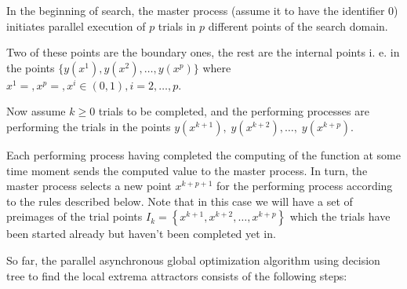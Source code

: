 \documentclass{svproc}
\begin{document}
In the beginning of search, the master process (assume it to have the identifier $0$) initiates parallel  execution of $p$ trials in $p$ different points of the search domain.

Two of these points are the boundary ones, the rest are the internal points i. e. in the points  $\{y\left(x^1\right),y\left(x^2\right),\ldots,y\left(x^p\right)\}$ where $x^1=,x^p=,x^i\in\left(0,1\right),i=2,\ldots,p$.

Now assume $k\geq0$ trials to be completed, and the performing processes are performing the trials in  the points $y\left(x^{k+1}\right),\;y\left(x^{k+2}\right),\ldots,\;y\left(x^{k+p}\right)$.

Each performing process having completed the computing of the function at some time moment sends  the computed value to the master process. In turn, the master process selects a new point  $x^{k+p+1}$ for the performing process according to the rules described below. Note that in this case  we will have a set of preimages of the trial points  $I_k=\left\{x^{k+1},x^{k+2},\ldots,x^{k+p}\right\}$ which the trials have been started already but haven’t been completed yet in.

So far, the parallel asynchronous global optimization algorithm using decision tree to find the local  extrema attractors consists of the following steps:
\end{document}
